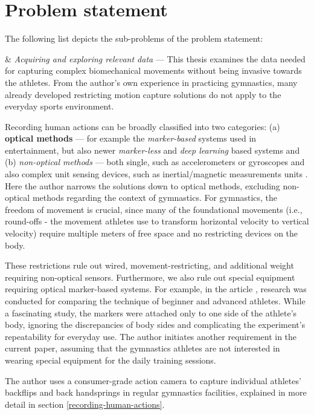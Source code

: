 \section{Problem statement}

The following list depicts the sub-problems of the problem statement:

\begin{easylist}[itemize]

    & \textit{Acquiring and exploring relevant data} --- This thesis examines the data needed for capturing complex biomechanical movements without being invasive towards the athletes. From the author's own experience in practicing gymnastics, many already developed restricting motion capture solutions do not apply to the everyday sports environment. 

    Recording human actions can be broadly classified into two categories: (a) \textbf{optical methods} --- for example the \textit{marker-based} systems used in entertainment, but also newer \textit{marker-less} and \textit{deep learning} based systems \cite{Elhayek_2015_CVPR} and (b) \textit{non-optical methods} --- both single, such as accelerometers or gyroscopes and also complex unit sensing devices, such as inertial/magnetic measurements units \cite{7567551}. Here the author narrows the solutions down to optical methods, excluding non-optical methods regarding the context of gymnastics. For gymnastics, the freedom of movement is crucial, since many of the foundational movements (i.e., round-offs - the movement athletes use to transform horizontal velocity to vertical velocity) require multiple meters of free space and no restricting devices on the body.

    These restrictions rule out wired, movement-restricting, and additional weight requiring non-optical sensors. Furthermore, we also rule out special equipment requiring optical marker-based systems. For example, in the article \cite{Burgess2001KINEMATICAO}, research was conducted for comparing the technique of beginner and advanced athletes. While a fascinating study, the markers were attached only to one side of the athlete's body, ignoring the discrepancies of body sides and complicating the experiment's repeatability for everyday use. The author initiates another requirement in the current paper, assuming that the gymnastics athletes are not interested in wearing special equipment for the daily training sessions.

    The author uses a consumer-grade action camera to capture individual athletes' backflips and back handsprings in regular gymnastics facilities, explained in more detail in section \ref{recording-human-actions}.
    

\end{easylist}
